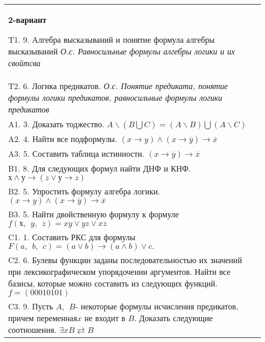 \documentclass{article}
\begin{document}
\begin{tabular}{m{17cm}}
\textbf{2-вариант}
\newline

T1. 9. Алгебра высказываний и понятие формула алгебры высказываний \emph{О.с. Равносильные формулы алгебры логики и их свойтсва} \\
T2. 6. Логика предикатов. \emph{О.с. Понятие предиката, понятие формулы логики предикатов, равносильные формулы логики предикатов} \\
A1. 3. Доказать тоджество. \(A\backslash(B\bigcup C) = (A\backslash B)\bigcup(A\backslash C)\) \\
A2. 4. Найти все подформулы. \((x \rightarrow y) \land (x \rightarrow \overline{y}) \rightarrow \overline{x}\) \\
A3. 5. Составить таблица истинности. \((x \rightarrow \overline{y}) \rightarrow \overline{x}\) \\
B1. 8. Для следующих формул найти ДНФ и КНФ. \(х \land у \rightarrow (z \vee у \rightarrow z)\) \\
B2. 5. Упростить формулу алгебра логики. \((x \rightarrow y) \land (x \rightarrow \overline{y}) \rightarrow \overline{x}\) \\
B3. 5. Найти двойственную формулу к формуле \(f(х,\ \ y,\ \ z) = xy \vee yz \vee xz\) \\
C1. 1. Составить РКС для формулы \(F(a,\ \ b,\ \ c) = (a \vee b) \rightarrow (a \land b) \vee c.\) \\
C2. 6. Булевы функции заданы последовательностью их значений при лексикографическом упорядочении аргументов. Найти все базисы, которые можно составить из следующих функций. \(f = (00010101)\) \\
C3. 9. Пусть \(A,\ \ B\)- некоторые формулы исчисления предикатов, причем переменная\(x\) не входит в \(B\). Доказать следующие соотношения. \(\exists xB \rightleftarrows B\)
 \\

\end{tabular}
\vspace{1cm}
\end{document}

